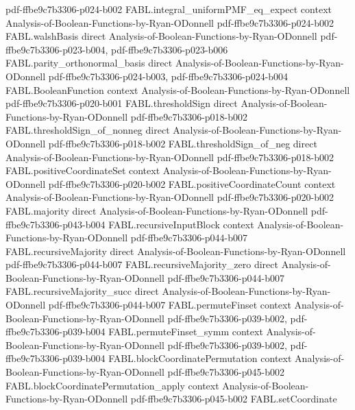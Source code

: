 \begin{theorem}
  {pdf-ffbe9c7b3306-p024-b002}
\proofstep
  {FABL.integral_uniformPMF_eq_expect}
  {context}
  {Analysis-of-Boolean-Functions-by-Ryan-ODonnell}
  {pdf-ffbe9c7b3306-p024-b002}
\proofstep
  {FABL.walshBasis}
  {direct}
  {Analysis-of-Boolean-Functions-by-Ryan-ODonnell}
  {pdf-ffbe9c7b3306-p023-b004,
    pdf-ffbe9c7b3306-p023-b006}
\proofstep
  {FABL.parity_orthonormal_basis}
  {direct}
  {Analysis-of-Boolean-Functions-by-Ryan-ODonnell}
  {pdf-ffbe9c7b3306-p024-b003,
    pdf-ffbe9c7b3306-p024-b004}
\proofstep
  {FABL.BooleanFunction}
  {context}
  {Analysis-of-Boolean-Functions-by-Ryan-ODonnell}
  {pdf-ffbe9c7b3306-p020-b001}
\proofstep
  {FABL.thresholdSign}
  {direct}
  {Analysis-of-Boolean-Functions-by-Ryan-ODonnell}
  {pdf-ffbe9c7b3306-p018-b002}
\proofstep
  {FABL.thresholdSign_of_nonneg}
  {direct}
  {Analysis-of-Boolean-Functions-by-Ryan-ODonnell}
  {pdf-ffbe9c7b3306-p018-b002}
\proofstep
  {FABL.thresholdSign_of_neg}
  {direct}
  {Analysis-of-Boolean-Functions-by-Ryan-ODonnell}
  {pdf-ffbe9c7b3306-p018-b002}
\proofstep
  {FABL.positiveCoordinateSet}
  {context}
  {Analysis-of-Boolean-Functions-by-Ryan-ODonnell}
  {pdf-ffbe9c7b3306-p020-b002}
\proofstep
  {FABL.positiveCoordinateCount}
  {context}
  {Analysis-of-Boolean-Functions-by-Ryan-ODonnell}
  {pdf-ffbe9c7b3306-p020-b002}
\proofstep
  {FABL.majority}
  {direct}
  {Analysis-of-Boolean-Functions-by-Ryan-ODonnell}
  {pdf-ffbe9c7b3306-p043-b004}
\proofstep
  {FABL.recursiveInputBlock}
  {context}
  {Analysis-of-Boolean-Functions-by-Ryan-ODonnell}
  {pdf-ffbe9c7b3306-p044-b007}
\proofstep
  {FABL.recursiveMajority}
  {direct}
  {Analysis-of-Boolean-Functions-by-Ryan-ODonnell}
  {pdf-ffbe9c7b3306-p044-b007}
\proofstep
  {FABL.recursiveMajority_zero}
  {direct}
  {Analysis-of-Boolean-Functions-by-Ryan-ODonnell}
  {pdf-ffbe9c7b3306-p044-b007}
\proofstep
  {FABL.recursiveMajority_succ}
  {direct}
  {Analysis-of-Boolean-Functions-by-Ryan-ODonnell}
  {pdf-ffbe9c7b3306-p044-b007}
\proofstep
  {FABL.permuteFinset}
  {context}
  {Analysis-of-Boolean-Functions-by-Ryan-ODonnell}
  {pdf-ffbe9c7b3306-p039-b002,
    pdf-ffbe9c7b3306-p039-b004}
\proofstep
  {FABL.permuteFinset_symm}
  {context}
  {Analysis-of-Boolean-Functions-by-Ryan-ODonnell}
  {pdf-ffbe9c7b3306-p039-b002,
    pdf-ffbe9c7b3306-p039-b004}
\proofstep
  {FABL.blockCoordinatePermutation}
  {context}
  {Analysis-of-Boolean-Functions-by-Ryan-ODonnell}
  {pdf-ffbe9c7b3306-p045-b002}
\proofstep
  {FABL.blockCoordinatePermutation_apply}
  {context}
  {Analysis-of-Boolean-Functions-by-Ryan-ODonnell}
  {pdf-ffbe9c7b3306-p045-b002}
\proofstep
  {FABL.setCoordinate}

\end{theorem}
